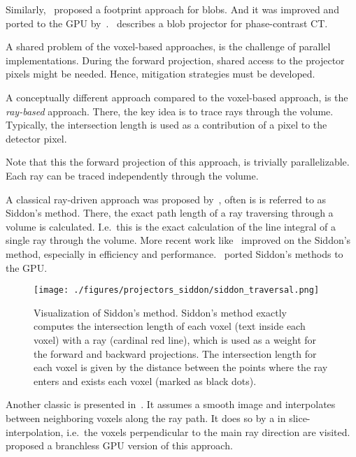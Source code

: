 Similarly,~\cite{ziegler_efficient_2006} proposed a footprint approach for blobs. And it was
improved and ported to the \gls{GPU} by~\cite{bippus_projector_2011}.~\cite{kohler_iterative_2011}
describes a blob projector for phase-contrast CT\@.

A shared problem of the voxel-based approaches, is the challenge of parallel implementations. During
the forward projection, shared access to the projector pixels might be needed. Hence, mitigation
strategies must be developed.

A conceptually different approach compared to the voxel-based approach, is the \textit{ray-based}
approach. There, the key idea is to trace rays through the volume. Typically, the intersection
length is used as a contribution of a pixel to the detector pixel.

Note that this the forward projection of this approach, is trivially parallelizable. Each ray can be
traced independently through the volume.

A classical ray-driven approach was proposed by~\cite{siddon_fast_1985}, often is is referred to as
Siddon's method. There, the exact path length of a ray traversing through a volume is calculated.
I.e.\ this is the exact calculation of the line integral of a single ray through the volume. More
recent work like~\cite{jacobs_fast_1998, christiaens_fast_1999, zhao_fast_2004, gao_fast_2012}
improved on the Siddon's method, especially in efficiency and
performance.~\cite{de_greef_accelerated_2009, xiao_efficient_2012} ported Siddon's methods to the
\gls{GPU}\@.

\begin{figure}[h]
	\centering
	\texttt{[image: ./figures/projectors\_siddon/siddon\_traversal.png]}
	\caption{Visualization of Siddon's method. Siddon's method exactly computes the intersection
		length of each voxel (text inside each voxel) with a ray (cardinal red line), which
		is used as a weight for the forward and backward projections. The intersection
		length for each voxel is given by the distance between the points where the ray
		enters and exists each voxel (marked as black
		dots).}\label{fig:visualization_siddon_traversal}
\end{figure}

Another classic is presented in~\cite{joseph_improved_1982}. It assumes a smooth image and
interpolates between neighboring voxels along the ray path. It does so by a in slice-interpolation,
i.e.\ the voxels perpendicular to the main ray direction are visited.~\cite{graetz_high_2020}
proposed a branchless \gls{GPU} version of this approach.

